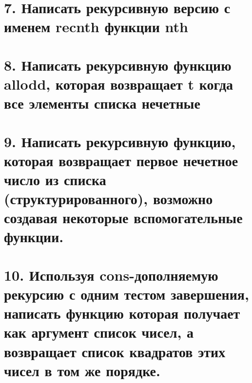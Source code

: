 

\section*{7. Написать рекурсивную версию с именем recnth функции nth}

	
\section*{8. Написать рекурсивную функцию allodd, которая возвращает t когда все элементы списка нечетные}



\section*{9. Написать рекурсивную функцию, которая возвращает первое нечетное число из списка (структурированного), возможно создавая некоторые вспомогательные функции.}



\section*{10. Используя cons-дополняемую рекурсию с одним тестом завершения, написать функцию которая получает как аргумент список чисел, а возвращает список квадратов этих чисел в том же порядке.}


